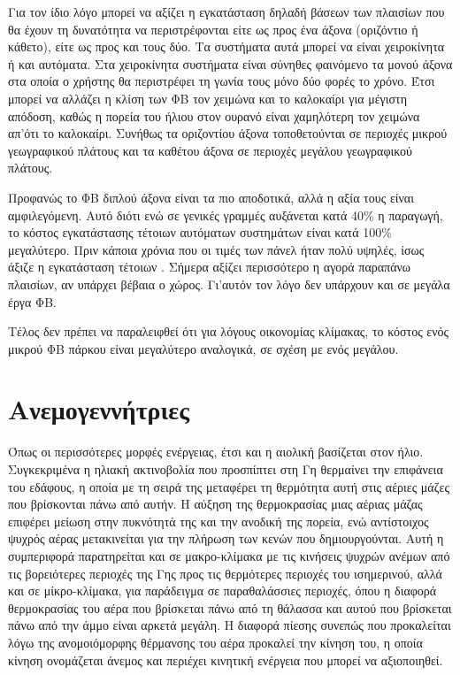 \documentclass[12pt]{report}
\begin{document}
Για τον ίδιο λόγο μπορεί να αξίζει η εγκατάσταση {} δηλαδή βάσεων των πλαισίων που θα έχουν τη δυνατότητα να περιστρέφονται είτε ως προς ένα άξονα (οριζόντιο ή κάθετο), είτε ως προς και τους δύο.
Τα συστήματα αυτά μπορεί να είναι χειροκίνητα ή και αυτόματα. Στα χειροκίνητα συστήματα είναι σύνηθες φαινόμενο τα {} μονού άξονα στα οποία ο χρήστης θα περιστρέφει τη γωνία τους μόνο δύο φορές το χρόνο.
Έτσι μπορεί να αλλάζει η κλίση των ΦΒ τον χειμώνα και το καλοκαίρι για μέγιστη απόδοση, καθώς η πορεία του ήλιου στον ουρανό είναι χαμηλότερη τον χειμώνα απ'ότι το καλοκαίρι. Συνήθως τα {} οριζοντίου άξονα
τοποθετούνται σε περιοχές μικρού γεωγραφικού πλάτους και τα {} καθέτου άξονα σε περιοχές μεγάλου γεωγραφικού πλάτους.

Προφανώς το ΦΒ διπλού άξονα είναι τα πιο αποδοτικά, αλλά η αξία τους είναι αμφιλεγόμενη. Αυτό διότι ενώ σε γενικές γραμμές αυξάνεται κατά 40\% η παραγωγή, το κόστος εγκατάστασης τέτοιων αυτόματων συστημάτων είναι κατά 100\%
μεγαλύτερο. Πριν κάποια χρόνια που οι τιμές των πάνελ ήταν πολύ υψηλές, ίσως άξιζε η εγκατάσταση τέτοιων {}. Σήμερα αξίζει περισσότερο η αγορά παραπάνω πλαισίων, αν υπάρχει βέβαια ο χώρος. Γι'αυτόν τον λόγο
δεν υπάρχουν και {} σε μεγάλα έργα ΦΒ.

Τέλος δεν πρέπει να παραλειφθεί ότι για λόγους οικονομίας κλίμακας, το κόστος ενός μικρού ΦΒ πάρκου είναι μεγαλύτερο αναλογικά, σε σχέση με ενός μεγάλου. 

\pagebreak
\section{Ανεμογεννήτριες}
Όπως οι περισσότερες μορφές ενέργειας, έτσι και η αιολική βασίζεται στον ήλιο. Συγκεκριμένα η ηλιακή ακτινοβολία που προσπίπτει στη Γη θερμαίνει την επιφάνεια του εδάφους, η οποία με τη σειρά της μεταφέρει τη θερμότητα αυτή 
στις αέριες μάζες που βρίσκονται πάνω από αυτήν. Η αύξηση της θερμοκρασίας μιας αέριας μάζας επιφέρει μείωση στην πυκνότητά της και την ανοδική της πορεία, ενώ αντίστοιχος ψυχρός αέρας μετακινείται για την πλήρωση των κενών
που δημιουργούνται. Αυτή η συμπεριφορά παρατηρείται και σε μακρο-κλίμακα με τις κινήσεις ψυχρών ανέμων από τις βορειότερες περιοχές της Γης προς τις θερμότερες περιοχές του ισημερινού, αλλά και σε μίκρο-κλίμακα, για παράδειγμα 
σε παραθαλάσσιες περιοχές, όπου η διαφορά θερμοκρασίας του αέρα που βρίσκεται πάνω από τη θάλασσα και αυτού που βρίσκεται πάνω από την άμμο είναι αρκετά μεγάλη. Η διαφορά πίεσης συνεπώς που προκαλείται λόγω της ανομοιόμορφης
θέρμανσης του αέρα προκαλεί την κίνηση του, η οποία κίνηση ονομάζεται άνεμος και περιέχει κινητική ενέργεια που μπορεί να αξιοποιηθεί.
\end{document}
